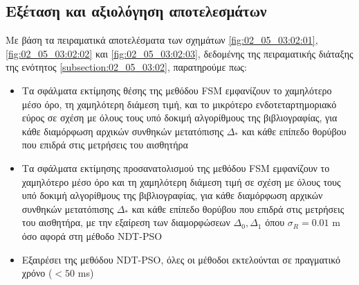 \subsection{Εξέταση και αξιολόγηση αποτελεσμάτων}
\label{subsection:02_05_03:03}

Με βάση τα πειραματικά αποτελέσματα των σχημάτων \ref{fig:02_05_03:02:01},
\ref{fig:02_05_03:02:02} και \ref{fig:02_05_03:02:03}, δεδομένης της
πειραματικής διάταξης της ενότητος \ref{subsection:02_05_03:02}, παρατηρούμε
πως:

\begin{itemize}
  \item Τα σφάλματα εκτίμησης θέσης της μεθόδου FSM εμφανίζουν το χαμηλότερο
        μέσο όρο, τη χαμηλότερη διάμεση τιμή, και το μικρότερο
        ενδοτεταρτημοριακό εύρος σε σχέση με όλους τους υπό δοκιμή αλγορίθμους
        της βιβλιογραφίας, για κάθε διαμόρφωση αρχικών συνθηκών μετατόπισης
        $\Delta_\ast$ και κάθε επίπεδο θορύβου που επιδρά στις μετρήσεις του
        αισθητήρα
  \item Τα σφάλματα εκτίμησης προσανατολισμού της μεθόδου FSM εμφανίζουν το
        χαμηλότερο μέσο όρο και τη χαμηλότερη διάμεση τιμή σε σχέση με όλους
        τους υπό δοκιμή αλγορίθμους της βιβλιογραφίας, για κάθε διαμόρφωση
        αρχικών συνθηκών μετατόπισης $\Delta_\ast$ και κάθε επίπεδο θορύβου που
        επιδρά στις μετρήσεις του αισθητήρα, με την εξαίρεση των διαμορφώσεων
        $\Delta_0,\Delta_1$ όπου $\sigma_R = 0.01$ m όσο αφορά στη μέθοδο
        NDT-PSO
  \item Εξαιρέσει της μεθόδου NDT-PSO, όλες οι μέθοδοι εκτελούνται σε πραγματικό
        χρόνο ($< 50$ ms)
\end{itemize}
